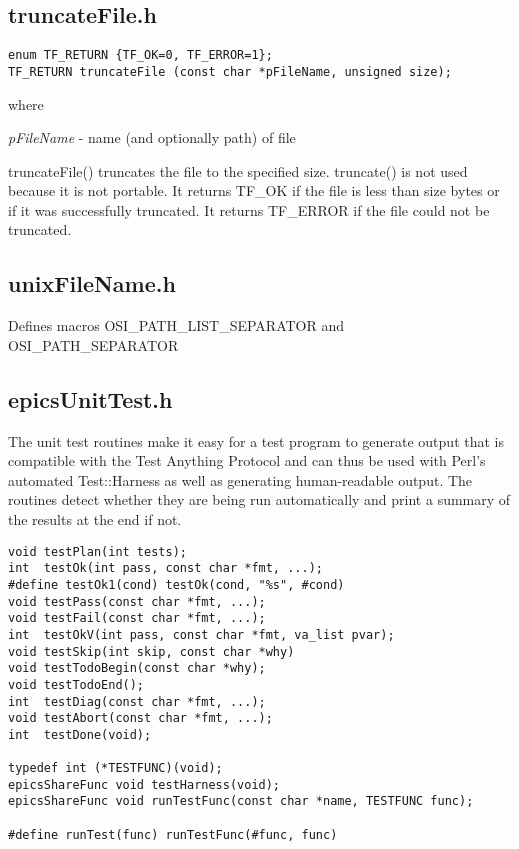 \subsection{truncateFile.h}

\begin{verbatim}
enum TF_RETURN {TF_OK=0, TF_ERROR=1};
TF_RETURN truncateFile (const char *pFileName, unsigned size);
\end{verbatim}

where

\begin{description}
\item \emph{pFileName} - name (and optionally path) of file

\end{description}

truncateFile() truncates the file to the specified size. truncate() is not used because it is not portable. It returns TF\_OK if 
the file is less than size bytes or if it was successfully truncated. It returns TF\_ERROR if the file could not be truncated.

\subsection{unixFileName.h}

Defines macros OSI\_PATH\_LIST\_SEPARATOR and OSI\_PATH\_SEPARATOR

\subsection{epicsUnitTest.h}

The unit test routines make it easy for a test program to generate output that is compatible with the Test Anything Protocol 
and can thus be used with Perl's automated Test::Harness as well as generating human-readable output. The routines 
detect whether they are being run automatically and print a summary of the results at the end if not.

\begin{verbatim}
void testPlan(int tests);
int  testOk(int pass, const char *fmt, ...);
#define testOk1(cond) testOk(cond, "%s", #cond)
void testPass(const char *fmt, ...);
void testFail(const char *fmt, ...);
int  testOkV(int pass, const char *fmt, va_list pvar);
void testSkip(int skip, const char *why)
void testTodoBegin(const char *why);
void testTodoEnd();
int  testDiag(const char *fmt, ...);
void testAbort(const char *fmt, ...);
int  testDone(void);

typedef int (*TESTFUNC)(void);
epicsShareFunc void testHarness(void);
epicsShareFunc void runTestFunc(const char *name, TESTFUNC func);

#define runTest(func) runTestFunc(#func, func)
\end{verbatim}

